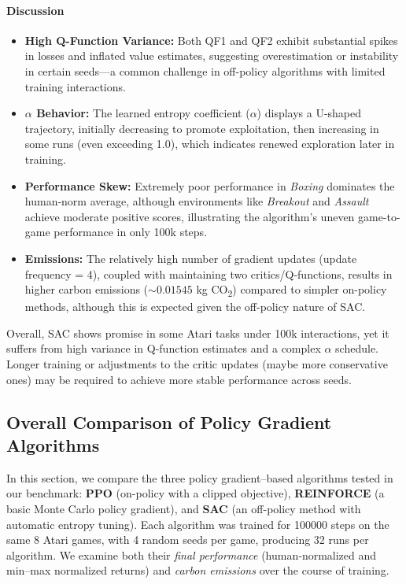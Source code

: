 \paragraph{Discussion}
\begin{itemize}
	\item \textbf{High Q-Function Variance:} Both QF1 and QF2 exhibit substantial spikes in losses and inflated value estimates, suggesting overestimation or instability in certain seeds—a common challenge in off-policy algorithms with limited training interactions.
	\item \textbf{\(\alpha\) Behavior:} The learned entropy coefficient (\(\alpha\)) displays a U-shaped trajectory, initially decreasing to promote exploitation, then increasing in some runs (even exceeding 1.0), which indicates renewed exploration later in training.
	\item \textbf{Performance Skew:} Extremely poor performance in \emph{Boxing} dominates the human‐norm average, although environments like \emph{Breakout} and \emph{Assault} achieve moderate positive scores, illustrating the algorithm’s uneven game-to-game performance in only 100k steps.
	\item \textbf{Emissions:} The relatively high number of gradient updates (update frequency = 4), coupled with maintaining two critics/Q-functions, results in higher carbon emissions (\(\sim0.01545\) kg CO\textsubscript{2}) compared to simpler on-policy methods, although this is expected given the off-policy nature of SAC.
\end{itemize}

Overall, SAC shows promise in some Atari tasks under 100k interactions, yet it suffers from high variance in Q-function estimates and a complex \(\alpha\) schedule. Longer training or adjustments to the critic updates (maybe more conservative ones) may be required to achieve more stable performance across seeds.

\subsection{Overall Comparison of Policy Gradient Algorithms}
\label{subsec:policy_comparison}

In this section, we compare the three policy gradient–based algorithms tested in our benchmark: \textbf{PPO} (on-policy with a clipped objective), \textbf{REINFORCE} (a basic Monte Carlo policy gradient), and \textbf{SAC} (an off-policy method with automatic entropy tuning). Each algorithm was trained for \num{100000} steps on the same 8 Atari games, with 4 random seeds per game, producing 32 runs per algorithm. We examine both their \emph{final performance} (human‐normalized and min–max normalized returns) and \emph{carbon emissions} over the course of training.

